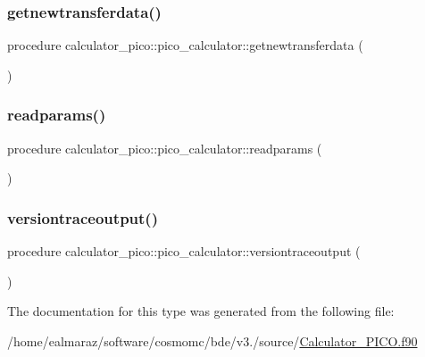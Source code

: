 \subsubsection{\texorpdfstring{getnewtransferdata()}{getnewtransferdata()}}
{\footnotesize\ttfamily procedure calculator\+\_\+pico\+::pico\+\_\+calculator\+::getnewtransferdata (\begin{DoxyParamCaption}{ }\end{DoxyParamCaption})\hspace{0.3cm}{\ttfamily [private]}}

\mbox{\label{structcalculator__pico_1_1pico__calculator_ae4497f9d07469e36c85ea5448e1da3a2}} 
\subsubsection{\texorpdfstring{readparams()}{readparams()}}
{\footnotesize\ttfamily procedure calculator\+\_\+pico\+::pico\+\_\+calculator\+::readparams (\begin{DoxyParamCaption}{ }\end{DoxyParamCaption})\hspace{0.3cm}{\ttfamily [private]}}

\mbox{\label{structcalculator__pico_1_1pico__calculator_aebf3c845a2233b617d46f39ac25c6ded}} 
\subsubsection{\texorpdfstring{versiontraceoutput()}{versiontraceoutput()}}
{\footnotesize\ttfamily procedure calculator\+\_\+pico\+::pico\+\_\+calculator\+::versiontraceoutput (\begin{DoxyParamCaption}{ }\end{DoxyParamCaption})\hspace{0.3cm}{\ttfamily [private]}}



The documentation for this type was generated from the following file\+:\begin{DoxyCompactItemize}
\item 
/home/ealmaraz/software/cosmomc/bde/v3./source/\mbox{\hyperlink{Calculator__PICO_8f90}{Calculator\+\_\+\+P\+I\+C\+O.\+f90}}\end{DoxyCompactItemize}
